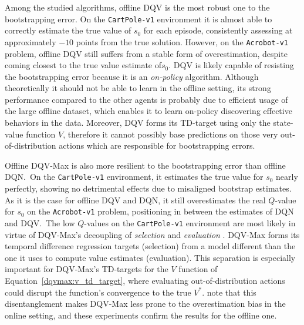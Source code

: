 Among the studied algorithms, offline DQV is the most robust one to
the bootstrapping error. On the \texttt{CartPole-v1} environment it is
almost able to correctly estimate the true value of $s_0$ for each
episode, consistently assessing at approximately $-10$ points from the
true solution. However, on the \texttt{Acrobot-v1} problem, offline
DQV still suffers from a stable form of overestimation, despite coming
closest to the true value estimate of$ s_0$. DQV is likely capable of
resisting the bootstrapping error because it is an \textit{on-policy}
algorithm. Although theoretically it should not be able to learn in
the offline setting, its strong
performance compared to the other agents is probably due to efficient
usage of the large offline dataset, which enables it to learn on-policy
discovering effective behaviors in the data. Moreover, DQV forms its
TD-target using only the state-value function $V$, therefore it cannot
possibly base predictions on those very out-of-distribution actions
which are responsible for bootstrapping errors.

Offline DQV-Max is also more resilient to the bootstrapping error than
offline DQN.\ On the \texttt{CartPole-v1} environment, it estimates
the true value for $s_0$ nearly perfectly, showing no detrimental
effects due to misaligned bootstrap estimates. As it is the case for
offline DQV and DQN, it still overestimates the real $Q$-value for
$s_0$ on the \texttt{Acrobot-v1} problem, positioning in between the
estimates of DQN and DQV.\ The low $Q$-values on the
\texttt{CartPole-v1} environment are most likely in virtue of
DQV-Max's decoupling of \textit{selection} and \textit{evaluation}
\citep{van2016deep}. DQV-Max forms its temporal difference regression
targets (selection) from a model different than the one it uses to
compute value estimates (evaluation). This separation is especially
important for DQV-Max's TD-targets for the $V$ function of
Equation~\ref{dqvmax:v_td_target}, where evaluating
out-of-distribution actions could disrupt the function's
convergence to the true $V^*$. \citet{sabatelli2020deep} note that
this disentanglement makes DQV-Max less prone to the overestimation
bias in the online setting, and these experiments confirm the results
for the offline one.

